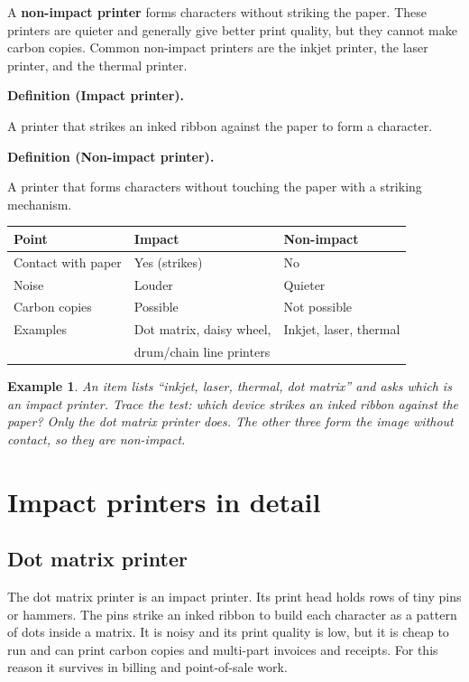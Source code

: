\documentclass[11pt]{article}
\newtheorem{example}{Example}[section]
\newenvironment{definitionbox}[1]{%
  \par\noindent\textbf{Definition (#1).}\ \itshape
}{\par\vspace{0.3em}}
\begin{document}
A \textbf{non-impact printer} forms characters without striking the paper.
These printers are quieter and generally give better print quality, but they
cannot make carbon copies. Common non-impact printers are the inkjet printer,
the laser printer, and the thermal printer.

\begin{definitionbox}{Impact printer}
A printer that strikes an inked ribbon against the paper to form a character.
\end{definitionbox}

\begin{definitionbox}{Non-impact printer}
A printer that forms characters without touching the paper with a striking
mechanism.
\end{definitionbox}

\begin{center}
\begin{tabular}{lll}
\toprule
\textbf{Point} & \textbf{Impact} & \textbf{Non-impact} \\
\midrule
Contact with paper & Yes (strikes) & No \\
Noise & Louder & Quieter \\
Carbon copies & Possible & Not possible \\
Examples & Dot matrix, daisy wheel, & Inkjet, laser, thermal \\
           & drum/chain line printers & \\
\bottomrule
\end{tabular}
\end{center}

\begin{example}
An item lists ``inkjet, laser, thermal, dot matrix'' and asks which is an
impact printer. Trace the test: which device strikes an inked ribbon against
the paper? Only the dot matrix printer does. The other three form the image
without contact, so they are non-impact.
\end{example}

\section{Impact printers in detail}
\subsection*{Dot matrix printer}
The dot matrix printer is an impact printer. Its print head holds rows of
tiny pins or hammers. The pins strike an inked ribbon to build each character
as a pattern of dots inside a matrix. It is noisy and its print quality is
low, but it is cheap to run and can print carbon copies and multi-part
invoices and receipts. For this reason it survives in billing and point-of-sale
work.
\end{document}

